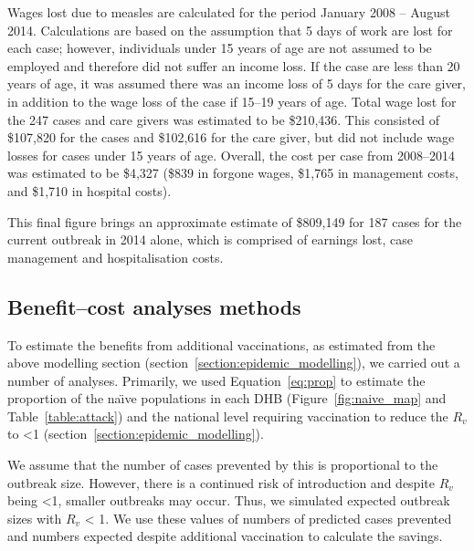 \documentclass{article}
\begin{document}
Wages lost due to measles are calculated for the period January 2008 -- August 2014. Calculations are based on the assumption that 5 days of work are lost for each case; however, individuals under 15 years of age are not assumed to be employed and therefore did not suffer an income loss. If the case are less than 20 years of age, it was assumed there was an income loss of 5 days for the care giver, in addition to the wage loss of the case if 15--19 years of age. Total wage lost for the 247 cases and care givers was estimated to be \$210,436. This consisted of \$107,820 for the cases and \$102,616 for the care giver, but did not include wage losses for cases under 15 years of age. Overall, the cost per case from 2008--2014 was estimated to be \$4,327 (\$839 in forgone wages, \$1,765 in management costs, and \$1,710 in hospital costs).

This final figure brings an approximate estimate of \$809,149 for 187 cases for the current outbreak in 2014 alone, which is comprised of earnings lost, case management and hospitalisation costs.

\subsection{Benefit--cost analyses methods}
\label{sub:cost_benefit}

To estimate the benefits from additional vaccinations, as estimated from the above modelling section (section~\autoref{section:epidemic_modelling}), we carried out a number of analyses. Primarily, we used Equation~\autoref{eq:prop} to estimate the proportion of the na\"{\i}ve populations in each DHB (Figure~\autoref{fig:naive_map} and Table~\autoref{table:attack}) and the national level requiring vaccination to reduce the $R_v$ to <1 (section~\autoref{section:epidemic_modelling}). 

We assume that the number of cases prevented by this is proportional to the outbreak size. However, there is a continued risk of introduction and despite $R_v$ being <1, smaller outbreaks may occur. Thus, we simulated expected outbreak sizes with $R_v$ < 1. We use these values of numbers of predicted cases prevented and numbers expected despite additional vaccination to calculate the savings. 
\end{document}

